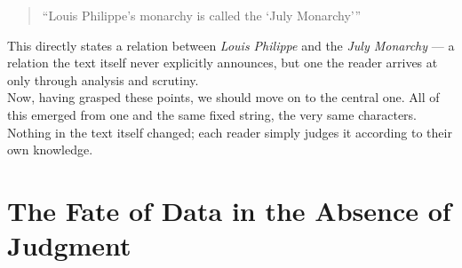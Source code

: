 \begin{quote}
``Louis Philippe's monarchy is called the `July Monarchy'''
\end{quote}
This directly states a relation between \textit{Louis Philippe} and the \textit{July Monarchy} --- a relation the text itself never explicitly announces, but one the reader arrives at only through analysis and scrutiny.\\
Now, having grasped these points, we should move on to the central one. All of this emerged from one and the same fixed string, the very same characters. Nothing in the text itself changed; each reader simply judges it according to their own knowledge.
\newpage
\section{The Fate of Data in the Absence of Judgment}
\label{sec:fate-of-data-without-judgment}

